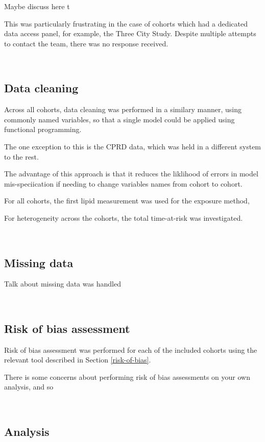 \documentclass[a4paper, twoside]{templates/ociamthesis}
\begin{document}
Maybe discuss here t

This was particularly frustrating in the case of cohorts which had a dedicated data access panel, for example, the Three City Study. Despite multiple attempts to contact the team, there was no response received.

~

\hypertarget{data-cleaning}{%
\subsection{Data cleaning}\label{data-cleaning}}

Across all cohorts, data cleaning was performed in a similary manner, using commonly named variables, so that a single model could be applied using functional programming.

The one exception to this is the CPRD data, which was held in a different system to the rest.

The advantage of this approach is that it reduces the liklihood of errors in model mis-speciication if needing to change variables names from cohort to cohort.

For all cohorts, the first lipid measurement was used for the exposure method,

For heterogeneity across the cohorts, the total time-at-risk was investigated.

~

\hypertarget{missing-data-2}{%
\subsection{Missing data}\label{missing-data-2}}

Talk about missing data was handled

~

\hypertarget{risk-of-bias-assessment}{%
\subsection{Risk of bias assessment}\label{risk-of-bias-assessment}}

Risk of bias assessment was performed for each of the included cohorts using the relevant tool described in Section \ref{risk-of-bias}.

There is some concerns about performing risk of bias assessments on your own analysis, and so

~

\hypertarget{analysis}{%
\subsection{Analysis}\label{analysis}}
\end{document}
